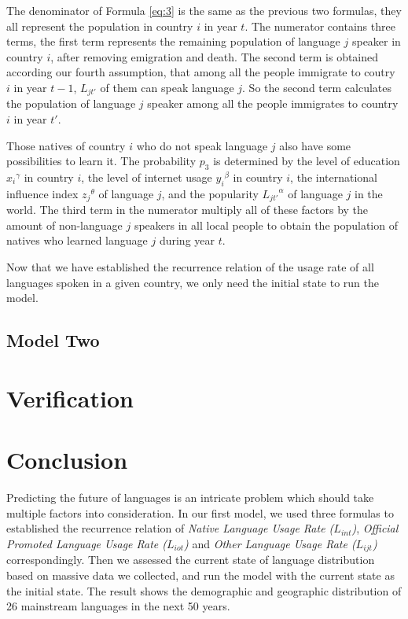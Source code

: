 \documentclass{mcmthesis}
\begin{document}
The denominator of Formula \ref{eq:3} is the same as the previous two formulas, they all represent the population in country $i$ in year $t$. The numerator contains three terms, the first term represents the remaining population of language $j$ speaker in country $i$, after removing emigration and death. The second term is obtained according our fourth assumption, that among all the people immigrate to coutry $i$ in year $t-1$, $L_{jt'}$ of them can speak language $j$. So the second term calculates the population of language $j$ speaker among all the people immigrates to country $i$ in year $t'$.

Those natives of country $i$ who do not speak language $j$ also have some possibilities to learn it. The probability $p_3$ is determined by the level of education ${x_i}^\gamma$ in country $i$, the level of internet usage ${y_i}^\beta$ in country $i$, the international influence index ${z_j}^\theta$ of language $j$, and the popularity ${L_{jt'}}^\alpha$ of language $j$ in the world. The third term in the numerator multiply all of these factors by the amount of non-language $j$ speakers in all local people to obtain the population of natives who learned language $j$ during year $t$.

Now that we have established the recurrence relation of the usage rate of all languages spoken in a given country, we only need the initial state to run the model.


\subsection{Model Two}

\section{Verification}
\section{Conclusion}
Predicting the future of languages is an intricate problem which should take multiple factors into consideration. In our first model, we used three formulas to established the recurrence relation of \textit{Native Language Usage Rate ($L_{int}$)}, \textit{Official Promoted Language Usage Rate ($L_{iot}$)} and \textit{Other Language Usage Rate ($L_{ijt}$)} correspondingly. Then we assessed the current state of language distribution based on massive data we collected, and run the model with the current state as the initial state. The result shows the demographic and geographic distribution of 26 mainstream languages in the next 50 years.
\end{document}
